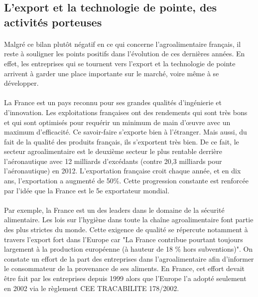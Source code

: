 \documentclass[a4paper,12pt]{report}
\begin{document}
		\subsection{L'export et la technologie de pointe, des activités porteuses}
			\paragraph{}Malgré ce bilan plutôt négatif en ce qui concerne l’agroalimentaire français, il reste à souligner les points positifs dans l’évolution de ces dernières années. En effet, les entreprises qui se tournent vers l’export et la technologie de pointe arrivent à garder une place importante sur le marché, voire même à se développer.
			
			\paragraph{}La France est un pays reconnu pour ses grandes qualités d’ingénierie et d’innovation. Les exploitations françaises ont des rendements qui sont très bons et qui sont optimisés pour requérir un minimum de main d'œuvre avec un maximum d’efficacité. Ce savoir-faire s’exporte bien à l’étranger. Mais aussi, du fait de la qualité des produits français, ils s’exportent très bien. De ce fait, le secteur agroalimentaire est le deuxième secteur le plus rentable derrière l’aéronautique avec 12 milliards d’excédants (contre 20,3 milliards pour l’aéronautique) en 2012\cite{AAExport2014}. L’exportation française croit chaque année, et en dix ans, l’exportation a augmenté de 50\%. Cette progression constante est renforcée par l’idée que la France est le 5e exportateur mondial.
			
			\paragraph{}Par exemple, la France est un des leaders dans le domaine de la sécurité alimentaire. Les lois sur l'hygiène dans toute la chaîne agroalimentaire font partie des plus strictes du monde. Cette exigence de qualité se répercute notamment à travers l'export fort dans l'Europe  car "La France contribue pourtant toujours largement à la production
			européenne (à hauteur de 18 \% hors subventions)".\cite{TechnoCle}	On constate un effort de la part des entreprises dans l'agroalimentaire afin d'informer le consommateur de la provenance de ses aliments. En France, cet effort devait être fait par les entreprises depuis 1999 alors que l'Europe l'a adopté seulement en 2002 via  le règlement CEE TRACABILITE 178/2002.\cite{Tracabilite}
			
\end{document}
